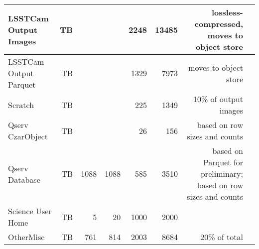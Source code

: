 \begin{longtable} { |p{}  |r  |r  |r  |r  |r  |r  |r |}
{LSSTCam Output Images}&{TB}&{}&{}&{2248}&{13485}&{lossless-compressed, moves to object store} \\ \hline
{LSSTCam Output Parquet}&{TB}&{}&{}&{1329}&{7973}&{moves to object store} \\ \hline
{Scratch}&{TB}&{}&{}&{225}&{1349}&{10\% of output images} \\ \hline
{Qserv Czar\/Object}&{TB}&{}&{}&{26}&{156}&{based on row sizes and counts} \\ \hline
{Qserv Database}&{TB}&{1088}&{1088}&{585}&{3510}&{based on Parquet for preliminary; based on row sizes and counts} \\ \hline
{Science User Home}&{TB}&{5}&{20}&{1000}&{2000}& \\ \hline
{Other\/Misc}&{TB}&{761}&{814}&{2003}&{8684}&{20\% of total} \\ \hline
\end{longtable} \normalsize
